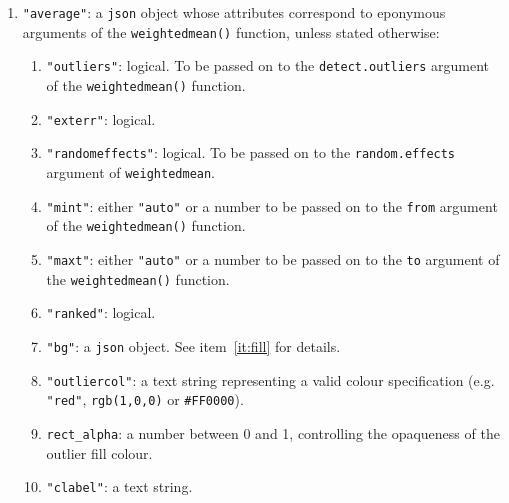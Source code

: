 \begin{refsection}
\begin{enumerate}[leftmargin=\parindent,align=left,
      labelwidth=\parindent,label*=2.\arabic*.]
\begin{enumerate}[leftmargin=\parindent,align=left,
      labelwidth=\parindent,label*=\arabic*.]
    in \texttt{R}.
  \item{\tt "cex"}: a positive number.
  \item{\tt "bg"}: a \texttt{json} object. See item~\ref{it:fill} for
    details.
  \item{\tt "shownumbers"}: logical. To be passed on to the argument
    \texttt{show.numbers} argument of the \texttt{isochron()}
    function.
  \item{\tt "numpeaks"}: \texttt{"auto"}, \texttt{"min"}, or an
    integer from 0 to 5.
  \item{\tt "clabel"}: a text string.
  \item{\tt "exterr"}: logical.
  \end{enumerate}  
\item{\tt "average"}: a \texttt{json} object whose attributes
  correspond to eponymous arguments of the \texttt{weightedmean()}
  function, unless stated otherwise:
  \begin{enumerate}[leftmargin=\parindent,align=left,
      labelwidth=\parindent,label*=\arabic*.]
    \item{\tt "outliers"}: logical. To be
      passed on to the \texttt{detect.outliers} argument of the
      \texttt{weightedmean()} function.
    \item{\tt "exterr"}: logical.
    \item{\tt "randomeffects"}: logical. To be passed on to the
      \texttt{random.effects} argument of \texttt{weightedmean}.
    \item{\tt "mint"}: either \texttt{"auto"} or a number to be passed
      on to the \texttt{from} argument of the \texttt{weightedmean()}
      function.
    \item{\tt "maxt"}: either \texttt{"auto"} or a number to be passed
      on to the \texttt{to} argument of the \texttt{weightedmean()}
      function.
    \item{\tt "ranked"}: logical.
    \item{\tt "bg"}: a \texttt{json} object. See item~\ref{it:fill}
      for details.
    \item{\tt "outliercol"}: a text string representing a valid colour
      specification (e.g. \texttt{"red"}, \texttt{rgb(1,0,0)} or
      \texttt{\#FF0000}).
    \item{ \verb|rect_alpha|}: a number between 0 and 1, controlling
      the opaqueness of the outlier fill colour.
    \item{\tt "clabel"}: a text string.
  \end{enumerate}  

\end{enumerate}
\end{refsection}
